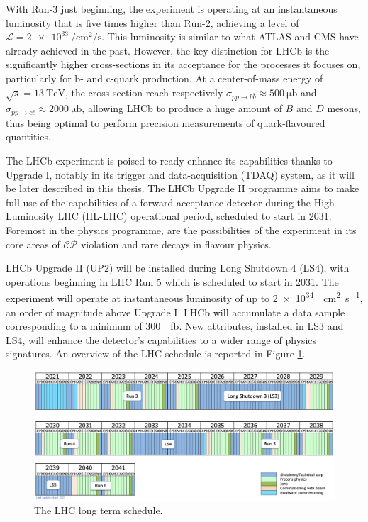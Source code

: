 With Run-3 just beginning, the experiment is operating at an instantaneous luminosity that is five times higher than Run-2, achieving a level of $\mathcal{L}=\SI{2e33}{\per\centi\meter\squared\per\second}$. This luminosity is similar to what ATLAS and CMS have already achieved in the past. However, the key distinction for LHCb is the significantly higher cross-sections in its acceptance for the processes it focuses on, particularly for b- and c-quark production. At a center-of-mass energy of $\sqrt{s}=\SI{13}{\tera\eV}$, the cross section reach respectively $\sigma_{pp\rightarrow b\bar{b}}\approx\SI{500}{\micro\barn}$ and $\sigma_{pp\rightarrow c\bar{c}}\approx\SI{2000}{\micro\barn}$\cite{bCrossSection, Aaij:2057627}, allowing LHCb to produce a huge amount of $B$ and $D$ mesons, thus being optimal to perform precision measurements of quark-flavoured quantities.

The LHCb experiment is poised to ready enhance its capabilities thanks to Upgrade I\cite{lhcbcollaboration2023lhcb}, notably in its trigger and data-acquisition (TDAQ) system, as it will be later described in this thesis. 
The LHCb Upgrade II programme\cite{CERN-LHCC-2021-012} aims to make full use of the capabilities of a forward acceptance detector during the High Luminosity LHC (HL-LHC) operational period, scheduled to start in 2031. Foremost in the physics programme, are the possibilities of the experiment in its core areas of $\mathcal{CP}$ violation and rare decays in flavour physics.

LHCb Upgrade II (UP2) will be installed during Long Shutdown 4 (LS4), with operations beginning in LHC Run 5 which is scheduled to start in 2031. The experiment will operate at instantaneous luminosity of up to \SI{2e34}{\per\centi\meter\squared\per\second}, an order of magnitude above Upgrade I. LHCb will accumulate a data sample corresponding to a minimum of \SI{300}{\per\femto\barn}\cite{Efthymiopoulos:2319258}. New attributes, installed in LS3 and LS4, will enhance the detector’s capabilities to a wider range of physics signatures. An overview of the LHC schedule is reported in Figure \ref{fig:LHC_schedule}.

\begin{figure}
    \centering
    \includegraphics[width=\textwidth]{figures/LHC-long-term-Apr23.png}
    \caption{The LHC long term schedule.}
    \label{fig:LHC_schedule}
\end{figure}

